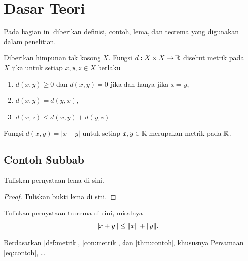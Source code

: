 \section{Dasar Teori}
Pada bagian ini diberikan definisi, contoh, lema, dan teorema yang digunakan dalam penelitian.

\begin{definisi}\label{def:metrik}
  Diberikan himpunan tak kosong $X$. Fungsi $d:X\times X\to\mathbb{R}$ disebut metrik pada $X$ jika untuk setiap $x,y,z\in X$ berlaku
  \begin{enumerate}
    \item[(a)] $d(x,y)\geq 0$ dan $d(x,y)=0$ jika dan hanya jika $x=y$,
    \item[(b)] $d(x,y)=d(y,x)$,
    \item[(c)] $d(x,z)\leq d(x,y)+d(y,z)$.
  \end{enumerate}
\end{definisi}

\begin{contoh}\label{con:metrik}
  Fungsi $d(x,y)=|x-y|$ untuk setiap $x,y\in\mathbb{R}$ merupakan metrik pada $\mathbb{R}$.
\end{contoh}

\subsection{Contoh Subbab}
\begin{lema}\label{lem:contoh}
  Tuliskan pernyataan lema di sini.
\end{lema}
\begin{proof}
  Tuliskan bukti lema di sini.
\end{proof}

\begin{teorema}\label{thm:contoh}
  Tuliskan pernyataan teorema di sini, misalnya
  \begin{equation}\label{eq:contoh}
    \norm{x+y}\leq\norm{x}+\norm{y}.
  \end{equation}
\end{teorema}

Berdasarkan \autoref{def:metrik}, \autoref{con:metrik}, dan \autoref{thm:contoh}, khususnya Persamaan \eqref{eq:contoh}, \dots
